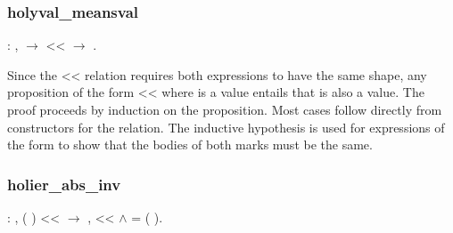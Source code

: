 \documentclass[12pt]{report}
\begin{document}
\begin{prooftree}
\end{prooftree}


\subsubsection{holyval\_meansval}

\begin{coqdoccode}
\coqdocemptyline
\coqdocindent{1.00em}
  : \coqdockw{\ensuremath{\forall}}  ,\coqdoceol
\coqdocindent{2.00em}
  \ensuremath{\rightarrow}\coqdoceol
\coqdocindent{2.00em}
 <<  \ensuremath{\rightarrow}\coqdoceol
\coqdocindent{2.00em}
 .\coqdoceol
\coqdocemptyline
\end{coqdoccode}

Since the << relation requires both expressions to have the same
shape, any proposition of the form  << 
where  is a value entails that  is also
a value. The proof proceeds by induction on the 
proposition.  Most cases follow directly from constructors for the
 relation. The inductive hypothesis is used for
expressions of the form  
 to show that the bodies of both marks must be the
same. 

\subsubsection{holier\_abs\_inv}

\begin{coqdoccode}
\coqdocemptyline
\coqdocindent{1.00em}
  : \coqdockw{\ensuremath{\forall}}    ,\coqdoceol
\coqdocindent{2.00em}
(   ) <<  \ensuremath{\rightarrow}\coqdoceol
\coqdocindent{2.00em}
\coqdoctac{\ensuremath{\exists}} ,  <<  \ensuremath{\land}  = (   ).\coqdoceol
\coqdocemptyline
\end{coqdoccode}
\end{document}

